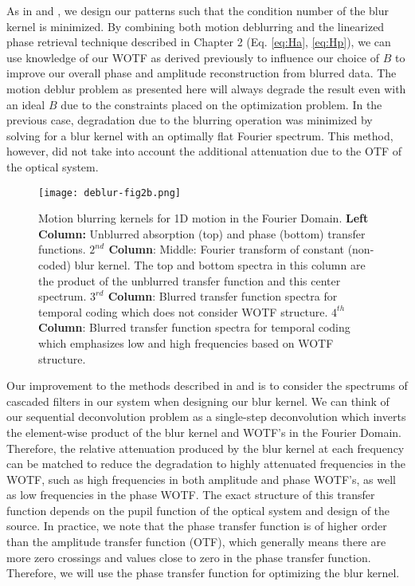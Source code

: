 As in \cite{raskar2006coded} and \cite{Ma:15}, we design our patterns such that the condition number of the blur kernel is minimized. By combining both motion deblurring and the linearized phase retrieval technique described in Chapter 2 (Eq. \ref{eq:Ha}, \ref{eq:Hp}), we can use knowledge of our WOTF as derived previously to influence our choice of $B$ to improve our overall phase and amplitude reconstruction from blurred data. The motion deblur problem as presented here will always degrade the result even with an ideal $B$ due to the constraints placed on the optimization problem. In the previous case, degradation due to the blurring operation was minimized by solving for a blur kernel with an optimally flat Fourier spectrum. This method, however, did not take into account the additional attenuation due to the OTF of the optical system.

\begin{figure}[h]
\centering
\texttt{[image: deblur-fig2b.png]}
\caption{\label{fig:deblurKernels}
Motion blurring kernels for 1D motion in the Fourier Domain.  \textbf{Left Column:} Unblurred absorption (top) and phase (bottom) transfer functions. \textbf{$2^{nd}$ Column}: Middle: Fourier transform of constant (non-coded) blur kernel. The top and bottom spectra in this column are the product of the unblurred transfer function and this center spectrum. \textbf{$3^{rd}$ Column}: Blurred transfer function spectra for temporal coding which does not consider WOTF structure. \textbf{$4^{th}$ Column}: Blurred transfer function spectra for temporal coding which emphasizes low and high frequencies based on WOTF structure.}
\end{figure}

Our improvement to the methods described in \cite{raskar2006coded} and \cite{Ma:15} is to consider the spectrums of cascaded filters in our system when designing our blur kernel. We can think of our sequential deconvolution problem as a single-step deconvolution which inverts the element-wise product of the blur kernel and WOTF's in the Fourier Domain. Therefore, the relative attenuation produced by the blur kernel at each frequency can be matched to reduce the degradation to highly attenuated frequencies in the WOTF, such as high frequencies in both amplitude and phase WOTF's, as well as low frequencies in the phase WOTF. The exact structure of this transfer function depends on the  pupil function of the optical system and design of the source. In practice, we note that the phase transfer function is of higher order than the amplitude transfer function (OTF), which generally means there are more zero crossings and values close to zero in the phase transfer function. Therefore, we will use the phase transfer function for optimizing the blur kernel.

